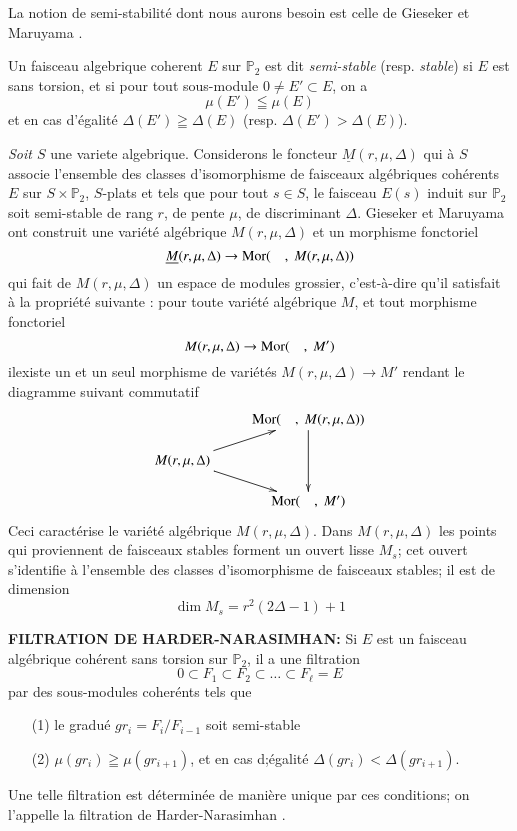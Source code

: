 La notion de semi-stabilit\'e dont nous aurons besoin est celle de
Gieseker \cite{chap5-key7} et Maruyama \cite{chap5-key12}.

\begin{definition}\label{chap5-defi1}
Un faisceau algebrique coherent $E$ sur $\mathbb{P}_{2}$ est dit {\em
semi-stable} (resp. {\em stable}) si $E$ est sans torsion, et si pour
tout sous-module $0\neq E'\subset E$, on a 
$$
\mu(E')\leqq \mu(E)
$$
et en cas d'\'egalit\'e $\Delta(E')\geqq \Delta(E)$
(resp. $\Delta(E')>\Delta(E)$). 
\end{definition}

{\em Soit $S$} une variete algebrique. Considerons le foncteur
$\underline{M}(r,\mu,\Delta)$ qui \`a $S$ associe l'ensemble des
classes d'isomorphisme de faisceaux alg\'ebriques coh\'erents $E$ sur
$S\times \mathbb{P}_{2}$, $S$-plats et tels que pour tout $s\in S$, le
faisceau $E(s)$ induit sur $\mathbb{P}_{2}$ soit semi-stable de rang
$r$, de pente $\mu$, de discriminant
$\Delta$. Gieseker \cite{chap5-key7} et Maruyama \cite{chap5-key12}
ont construit une vari\'et\'e alg\'ebrique $M(r,\mu,\Delta)$ et un
morphisme fonctoriel
$$
\underline{M}(r,\mu,\Delta)\to \Mor(\quad , \ M(r,\mu,\Delta))
$$
qui fait de $M(r,\mu,\Delta)$ un espace de modules grossier,
c'est-\`a-dire qu'il satisfait \`a la propri\'et\'e suivante : pour
toute vari\'et\'e alg\'ebrique $M$, et tout morphisme fonctoriel
$$
M(r,\mu,\Delta)\to \operatorname{Mor}(\quad , \ M')
$$
il\pageoriginale existe un et un seul morphisme de vari\'et\'es
$M(r,\mu,\Delta)\to M'$ rendant le diagramme suivant commutatif
\[
\xymatrix@R=.5cm{
 & \Mor (\quad, \ M(r,\mu,\Delta))\ar[dd]\\
M(r,\mu,\Delta)\ar[ur]\ar[dr] &\\
 & \Mor(\quad, \ M')
}
\]
Ceci caract\'erise le vari\'et\'e alg\'ebrique $M(r,\mu,\Delta)$. Dans
$M(r,\mu,\Delta)$ les points qui proviennent de faisceaux stables
forment un ouvert lisse $M_{s}$; cet ouvert s'identifie \`a l'ensemble
des classes d'isomorphisme de faisceaux stables; il est de dimension
$$
\dim M_{s}=r^{2}(2\Delta-1)+1
$$

\noindent
{\bf FILTRATION DE HARDER-NARASIMHAN:}
Si $E$ est un faisceau alg\'ebrique coh\'erent sans torsion sur
$\mathbb{P}_{2}$, il a une filtration
$$
0\subset F_{1}\subset F_{2}\subset\ldots\subset F_{\ell}=E
$$
par des sous-modules coher\'ents tels que
\begin{itemize}
\item[(1)] le gradu\'e $gr_{i}=F_{i}/F_{i-1}$ soit semi-stable

\item[(2)] $\mu(gr_{i})\geqq \mu(gr_{i+1})$, et en cas d;\'egalit\'e
$\Delta(gr_{i})<\Delta(gr_{i+1})$. 
\end{itemize}
Une telle filtration est d\'etermin\'ee de mani\`ere unique par ces
conditions; on l'appelle la filtration de
Harder-Narasimhan \cite{chap5-key8}. 

